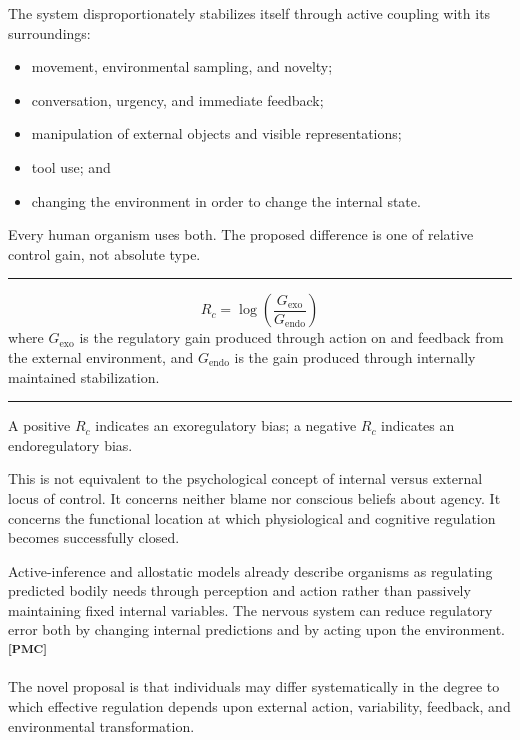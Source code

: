 \documentclass[10pt]{article}
\newcommand{\ActiveAccent}{Industrial}
\newcommand{\subhead}[1]{\Needspace{4\baselineskip}\vspace{0.5em}{\sffamily\bfseries\fontsize{10.5}{13}\selectfont\textcolor{\ActiveAccent}{#1}}\par\vspace{-0.1em}}
\newcommand{\sourcecue}[1]{\textsuperscript{\sffamily\bfseries\fontsize{6.5}{7}\selectfont\textcolor{\ActiveAccent}{[#1]}}}
\newenvironment{equationpanel}{\begin{center}\begin{minipage}{0.92\linewidth}\color{\ActiveAccent}\rule{\linewidth}{0.55pt}\par\vspace{-0.25em}\color{Ink}}{\vspace{-0.10em}\par\color{\ActiveAccent}\rule{\linewidth}{0.55pt}\end{minipage}\end{center}}
\begin{document}
\subhead{Exoregulatory closure}

The system disproportionately stabilizes itself through active coupling with its surroundings:

\begin{itemize}
  \item movement, environmental sampling, and novelty;
  \item conversation, urgency, and immediate feedback;
  \item manipulation of external objects and visible representations;
  \item tool use; and
  \item changing the environment in order to change the internal state.
\end{itemize}

Every human organism uses both. The proposed difference is one of relative control gain, not absolute type.

\begin{equationpanel}
\begin{equation*}
R_c = \log\!\left(\frac{G_{\mathrm{exo}}}{G_{\mathrm{endo}}}\right)
\end{equation*}
\small where $G_{\mathrm{exo}}$ is the regulatory gain produced through action on and feedback from the external environment, and $G_{\mathrm{endo}}$ is the gain produced through internally maintained stabilization.
\end{equationpanel}

A positive $R_c$ indicates an exoregulatory bias; a negative $R_c$ indicates an endoregulatory bias.

This is not equivalent to the psychological concept of internal versus external locus of control. It concerns neither blame nor conscious beliefs about agency. It concerns the functional location at which physiological and cognitive regulation becomes successfully closed.

Active-inference and allostatic models already describe organisms as regulating predicted bodily needs through perception and action rather than passively maintaining fixed internal variables. The nervous system can reduce regulatory error both by changing internal predictions and by acting upon the environment.\sourcecue{PMC}

The novel proposal is that individuals may differ systematically in the degree to which effective regulation depends upon external action, variability, feedback, and environmental transformation.
\end{document}
